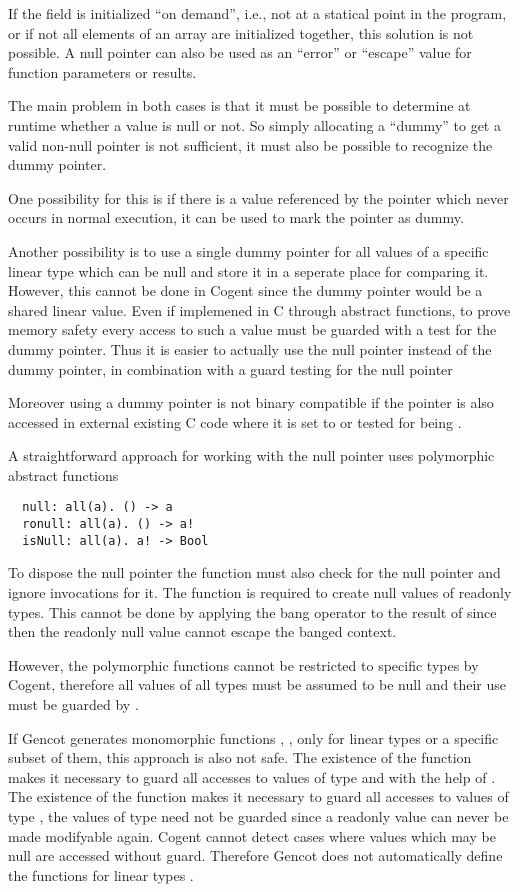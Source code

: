 If the field  is initialized ``on demand'', i.e., not at a statical point in the program, or if not all elements
of an array are initialized together, this solution is not possible.
A null pointer can also be used as an ``error'' or ``escape'' value for function parameters or results. 

The main problem in both cases is that it must be possible to determine at runtime whether a value is null or not. So simply
allocating a ``dummy'' to get a valid non-null pointer is not sufficient, it must also be possible to recognize the dummy pointer.

One possibility for this is if there is a value referenced by the pointer which never occurs in normal execution,
it can be used to mark the pointer as dummy. 

Another possibility is to use a single dummy pointer for all values of a specific linear type which can be null and store it 
in a seperate place for comparing it. However, this cannot be done in Cogent since the dummy pointer would be a shared linear 
value. Even if implemened in C through abstract functions, to prove memory safety every access to such a value must 
be guarded with a test for the dummy pointer. Thus it is easier to actually use the null pointer instead of the dummy pointer,
in combination with a guard testing for the null pointer

Moreover using a dummy pointer is not binary compatible if the pointer is 
also accessed in external existing C code where it is set to  or tested for being .

A straightforward approach for working with the null pointer uses polymorphic abstract functions
\begin{verbatim}
  null: all(a). () -> a
  ronull: all(a). () -> a!
  isNull: all(a). a! -> Bool
\end{verbatim}
To dispose the null pointer the function  must also check for the null pointer and ignore
invocations for it. The function  is required to create null values of readonly types. This cannot be done 
by applying the bang operator to the result of  since then the readonly null value
cannot escape the banged context. 

However, the polymorphic functions cannot be restricted to specific types  by Cogent, therefore all values of all
types must be assumed to be null and their use must be guarded by .

If Gencot generates monomorphic functions , ,  only for linear types or a
specific subset of them, this approach is also not safe. The existence of the function  makes it necessary to guard all accesses to values of type
 and  with the help of . The existence of the function  makes it necessary to guard
all accesses to values of type , the values of type  need not be guarded since a readonly value can never be 
made modifyable again. Cogent cannot detect cases where values which may be null are accessed without guard.
Therefore Gencot does not automatically define the functions for linear types .

